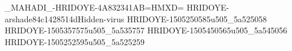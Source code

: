 _MAHADI_-HRIDOYE-4A832341AB=HMXD=
HRIDOYE-arshade84c1428514dHidden-virus
HRIDOYE-1505250585u505_5a525058
HRIDOYE-1505357575u505_5a535757
HRIDOYE-1505450565u505_5a545056
HRIDOYE-1505252595u505_5a525259
